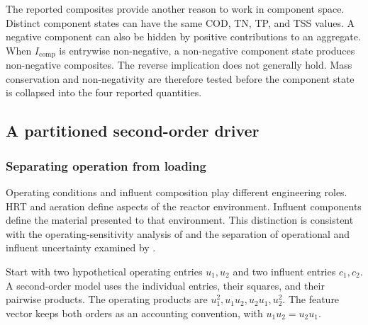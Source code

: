 The reported composites provide another reason to work in component space. Distinct component states can have the same COD, TN, TP, and TSS values. A negative component can also be hidden by positive contributions to an aggregate. When \(I_{\mathrm{comp}}\) is entrywise non-negative, a non-negative component state produces non-negative composites. The reverse implication does not generally hold. Mass conservation and non-negativity are therefore tested before the component state is collapsed into the four reported quantities.

\subsection{A partitioned second-order driver}

\subsubsection{Separating operation from loading}

Operating conditions and influent composition play different engineering roles. HRT and aeration define aspects of the reactor environment. Influent components define the material presented to that environment. This distinction is consistent with the operating-sensitivity analysis of \citet{Araujo2013} and the separation of operational and influent uncertainty examined by \citet{Machado2014}.

Start with two hypothetical operating entries \(u_1,u_2\) and two influent entries \(c_1,c_2\). A second-order model uses the individual entries, their squares, and their pairwise products. The operating products are \(u_1^2,u_1u_2,u_2u_1,u_2^2\). The feature vector keeps both orders as an accounting convention, with \(u_1u_2=u_2u_1\).


